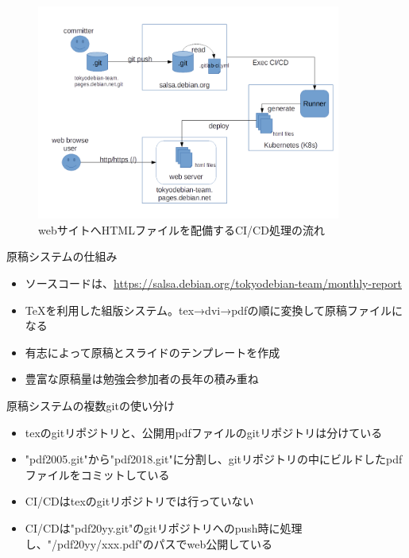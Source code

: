 \begin{frame}[containsverbatim]{}
  \begin{figure}[H]
    \begin{center}
      \includegraphics[width=10cm]{image201806/gitflow_web.png}
      \caption{webサイトへHTMLファイルを配備するCI/CD処理の流れ}
      \label{fig:deploy-html-CICD}
    \end{center}
  \end{figure}
\end{frame}



\begin{frame}[containsverbatim]{原稿システムの仕組み}
  \begin{itemize}
  \item ソースコードは、\url{https://salsa.debian.org/tokyodebian-team/monthly-report}
  \item TeXを利用した組版システム。tex→dvi→pdfの順に変換して原稿ファイルになる
  \item 有志によって原稿とスライドのテンプレートを作成
  \item 豊富な原稿量は勉強会参加者の長年の積み重ね
  \end{itemize}
\end{frame}

\begin{frame}[containsverbatim]{原稿システムの複数gitの使い分け}
  \begin{itemize}
  \item texのgitリポジトリと、公開用pdfファイルのgitリポジトリは分けている
  \item "pdf2005.git"から"pdf2018.git"に分割し、gitリポジトリの中にビルドしたpdfファイルをコミットしている
  \item CI/CDはtexのgitリポジトリでは行っていない
  \item CI/CDは"pdf20yy.git"のgitリポジトリへのpush時に処理し、"/pdf20yy/xxx.pdf"のパスでweb公開している
  \end{itemize}
\end{frame}

